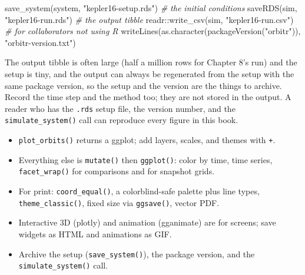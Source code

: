 \documentclass[
  10.5pt,
  letterpaper,
]{scrbook}
\newenvironment{Shaded}{\begin{snugshade}}{\end{snugshade}}
\newcommand{\CommentTok}[1]{\textcolor[rgb]{0.00,0.00,0.00}{\textit{#1}}}
\newcommand{\FunctionTok}[1]{\textcolor[rgb]{0.00,0.00,0.00}{#1}}
\newcommand{\NormalTok}[1]{\textcolor[rgb]{0.00,0.00,0.00}{#1}}
\newcommand{\SpecialCharTok}[1]{\textcolor[rgb]{0.00,0.00,0.00}{#1}}
\newcommand{\StringTok}[1]{\textcolor[rgb]{0.00,0.00,0.00}{#1}}
\providecommand{\tightlist}{%
  \setlength{\itemsep}{0pt}\setlength{\parskip}{0pt}}
\theoremstyle{definition}
\theoremstyle{plain}
\theoremstyle{remark}
\begin{document}
\begin{Shaded}
\begin{Highlighting}[]
\FunctionTok{save\_system}\NormalTok{(system, }\StringTok{"kepler16{-}setup.rds"}\NormalTok{)          }\CommentTok{\# the initial conditions}
\FunctionTok{saveRDS}\NormalTok{(sim, }\StringTok{"kepler16{-}run.rds"}\NormalTok{)                   }\CommentTok{\# the output tibble}
\NormalTok{readr}\SpecialCharTok{::}\FunctionTok{write\_csv}\NormalTok{(sim, }\StringTok{"kepler16{-}run.csv"}\NormalTok{)          }\CommentTok{\# for collaborators not using R}
\FunctionTok{writeLines}\NormalTok{(}\FunctionTok{as.character}\NormalTok{(}\FunctionTok{packageVersion}\NormalTok{(}\StringTok{"orbitr"}\NormalTok{)), }\StringTok{"orbitr{-}version.txt"}\NormalTok{)}
\end{Highlighting}
\end{Shaded}

The output tibble is often large (half a million rows for Chapter 8's
run) and the setup is tiny, and the output can always be regenerated
from the setup with the same package version, so the setup and the
version are the things to archive. Record the time step and the method
too; they are not stored in the output. A reader who has the
\texttt{.rds} setup file, the version number, and the
\texttt{simulate\_system()} call can reproduce every figure in this
book.

\begin{tcolorbox}[enhanced jigsaw, arc=.35mm, bottomrule=.15mm, bottomtitle=1mm, breakable, colback=white, colbacktitle=quarto-callout-tip-color!10!white, colframe=quarto-callout-tip-color-frame, coltitle=black, left=2mm, leftrule=.75mm, opacityback=0, opacitybacktitle=0.6, rightrule=.15mm, title={Key results}, titlerule=0mm, toprule=.15mm, toptitle=1mm]

\begin{itemize}
\tightlist
\item
  \texttt{plot\_orbits()} returns a ggplot; add layers, scales, and
  themes with \texttt{+}.
\item
  Everything else is \texttt{mutate()} then \texttt{ggplot()}: color by
  time, time series, \texttt{facet\_wrap()} for comparisons and for
  snapshot grids.
\item
  For print: \texttt{coord\_equal()}, a colorblind-safe palette plus
  line types, \texttt{theme\_classic()}, fixed size via
  \texttt{ggsave()}, vector PDF.
\item
  Interactive 3D (plotly) and animation (gganimate) are for screens;
  save widgets as HTML and animations as GIF.
\item
  Archive the setup (\texttt{save\_system()}), the package version, and
  the \texttt{simulate\_system()} call.
\end{itemize}

\end{tcolorbox}
\end{document}
